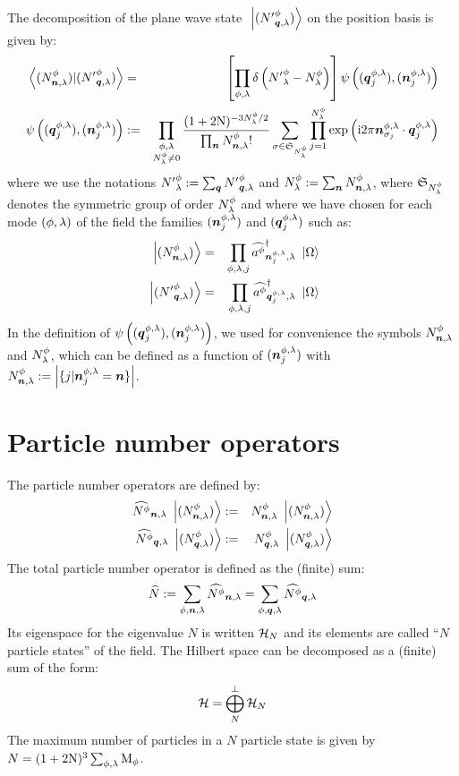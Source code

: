 \documentclass[10pt,a4paper,twoside,openany]{book}
\begin{document}
 The decomposition of the plane wave state $\ \left|{({N'}^{\phi}_{{\boldsymbol{q}}, {\lambda}})}\right\rangle$ on the position basis is given by:
\begin{eqnarray*}
\left\langle{({N}^{\phi}_{{\boldsymbol{n}}, {\lambda}})}|{({N'}^{\phi}_{{\boldsymbol{q}}, {\lambda}})}\right\rangle & = & \left[ \prod_{\phi, \lambda} \delta\left( {N'}^\phi_\lambda - N^\phi_\lambda \right) \right] \psi \left( ( \boldsymbol{q}^{\phi, \lambda}_j ), ( \boldsymbol{n}^{\phi, \lambda}_j ) \right) \\
\psi \left( ( \boldsymbol{q}^{\phi, \lambda}_j ), ( \boldsymbol{n}^{\phi, \lambda}_j ) \right) & := & \prod_{\substack{\phi, \lambda \\ N^\phi_\lambda \neq 0}} \frac{(1+2 \mathrm N)^{-3 N^\phi_\lambda / 2} }{\prod_{\boldsymbol{n}} {N}^{\phi}_{{\boldsymbol{n}}, {\lambda}} !} \sum_{\sigma \in \mathfrak{S}_{N^\phi_\lambda}} \prod_{j = 1}^{N^\phi_\lambda} \mathrm{exp} \left( {\mathrm{i} 2 \pi \boldsymbol{n}^{\phi, \lambda}_{\sigma_j} \cdot \boldsymbol{q}^{\phi, \lambda}_j} \right)
\end{eqnarray*}
where we use the notations ${N'}^\phi_\lambda := \sum_{\boldsymbol{q}} {N'}^{\phi}_{{\boldsymbol{q}}, {\lambda}}$ and $N^\phi_\lambda := \sum_{\boldsymbol{n}} {N}^{\phi}_{{\boldsymbol{n}}, {\lambda}}$, where $\mathfrak{S}_{N^\phi_\lambda}$ denotes the symmetric group of order $N^\phi_\lambda$ and where we have chosen for each mode $( \phi, \lambda )$ of the field the families $( \boldsymbol{n}^{\phi, \lambda}_j )$ and $( \boldsymbol{q}^{\phi, \lambda}_j )$ such as:
\begin{eqnarray*}
\ \left|{({N}^{\phi}_{{\boldsymbol{n}}, {\lambda}})}\right\rangle & = & \prod_{\phi, \lambda, j} \widehat{a^{\phi}}^{\dagger}_{{\boldsymbol{n}^{\phi, \lambda}_j}, {\lambda}} \ \left|{\Omega}\right\rangle \\
\ \left|{({N'}^{\phi}_{{\boldsymbol{q}}, {\lambda}})}\right\rangle & = & \prod_{\phi, \lambda, j} \widehat{a^{\phi}}^{\dagger}_{{\boldsymbol{q}^{\phi, \lambda}_j}, {\lambda}} \ \left|{\Omega}\right\rangle
\end{eqnarray*}
In the definition of $\psi \left( ( \boldsymbol{q}^{\phi, \lambda}_j ), ( \boldsymbol{n}^{\phi, \lambda}_j ) \right)$, we used for convenience the symbols ${N}^{\phi}_{{\boldsymbol{n}}, {\lambda}}$ and $N^\phi_\lambda$, which can be defined as a function of $( \boldsymbol{n}^{\phi, \lambda}_j )$ with ${N}^{\phi}_{{\boldsymbol{n}}, {\lambda}} := \left|  \{ j | \boldsymbol{n}^{\phi, \lambda}_j = \boldsymbol{n} \} \right|$.

\section{Particle number operators}

 The particle number operators are defined by:
\begin{eqnarray*}
\widehat{N^{\phi}}_{{\boldsymbol{n}}, {\lambda}} \ \left|{({N}^{\phi}_{{\boldsymbol{n}}, {\lambda}})}\right\rangle & := & {N}^{\phi}_{{\boldsymbol{n}}, {\lambda}} \ \left|{({N}^{\phi}_{{\boldsymbol{n}}, {\lambda}})}\right\rangle \\
\widehat{N^{\phi}}_{{\boldsymbol{q}}, {\lambda}} \ \left|{({N}^{\phi}_{{\boldsymbol{q}}, {\lambda}})}\right\rangle & := & {N}^{\phi}_{{\boldsymbol{q}}, {\lambda}} \ \left|{({N}^{\phi}_{{\boldsymbol{q}}, {\lambda}})}\right\rangle
\end{eqnarray*}
The total particle number operator is defined as the (finite) sum:
\begin{equation*}
\widehat{N} := \sum_{\phi,\boldsymbol{n},\lambda} \widehat{N^{\phi}}_{{\boldsymbol{n}}, {\lambda}} = \sum_{\phi,\boldsymbol{q},\lambda} \widehat{N^{\phi}}_{{\boldsymbol{q}}, {\lambda}}
\end{equation*}
Its eigenspace for the eigenvalue $N$ is written $\mathcal H_{N}$ and its elements are called ``$N$ particle states'' of the field. The Hilbert space can be decomposed as a (finite) sum of the form:
\begin{equation*}
\mathcal H = \bigoplus_{N}^\perp \mathcal H_{N}
\end{equation*}
The maximum number of particles in a $N$ particle state is given by $N = (1+2 \mathrm N)^3 \sum_{\phi,\lambda} \mathrm M_{\phi}$.
\end{document}
